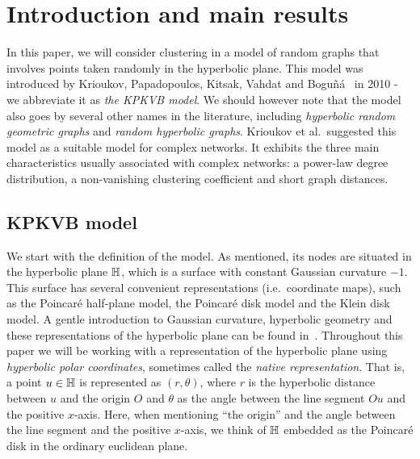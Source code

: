 \section{Introduction and main results}

In this paper, we will consider clustering in a model of random graphs that involves points taken randomly in the hyperbolic plane. This model was introduced by Krioukov, Papadopoulos, Kitsak, Vahdat and Bogu\~{n}\'a~\cite{krioukov2010hyperbolic} in 
2010 - we abbreviate it as \emph{the KPKVB model}. We should however note that the model also goes by several other names in the literature, including {\em hyperbolic random geometric graphs} and {\em random hyperbolic graphs}. Krioukov et al.~suggested this model as a suitable model for complex networks. It exhibits the three main characteristics usually associated with complex networks: a power-law degree distribution, a non-vanishing clustering coefficient and short graph distances.

\subsection{KPKVB model}
We start with the definition of the model. As mentioned, its nodes are situated in the hyperbolic plane ${\mathbb H}$, which is a surface with constant Gaussian curvature $-1$. This surface has several convenient representations (i.e.~coordinate maps), such as the Poincar\'e half-plane model, the Poincar\'e disk model and the Klein disk model. A gentle introduction to Gaussian curvature, hyperbolic geometry and these representations of the hyperbolic plane can be found in~\cite{stillwell2012geometry}. Throughout this paper we will be working with a representation of the hyperbolic plane using {\em hyperbolic polar coordinates}, sometimes called the {\em native representation}. That is, a point $u \in {\mathbb H}$ is represented as $(r,\theta)$, where $r$ is the hyperbolic distance between $u$ and the origin $O$ and $\theta$ as the angle between the line segment $Ou$ and the positive $x$-axis. 
Here, when mentioning ``the origin'' and the angle between the line segment and the positive $x$-axis, we think of ${\mathbb H}$ embedded as the Poincar\'e disk in the ordinary euclidean plane.

